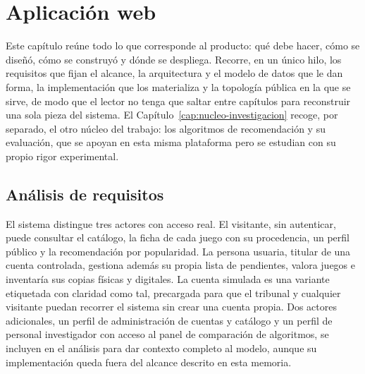 \chapter{Aplicación web}\label{cap:diseno}

Este capítulo reúne todo lo que corresponde al producto: qué debe hacer, cómo se diseñó, cómo
se construyó y dónde se despliega. Recorre, en un único hilo, los requisitos que fijan el
alcance, la arquitectura y el modelo de datos que le dan forma, la implementación que los
materializa y la topología pública en la que se sirve, de modo que el lector no tenga que
saltar entre capítulos para reconstruir una sola pieza del sistema. El Capítulo~\ref{cap:nucleo-investigacion}
recoge, por separado, el otro núcleo del trabajo: los algoritmos de recomendación y su
evaluación, que se apoyan en esta misma plataforma pero se estudian con su propio rigor
experimental.

\section{Análisis de requisitos}\label{cap:requisitos}

El sistema distingue tres actores con acceso real. El visitante, sin autenticar, puede
consultar el catálogo, la ficha de cada juego con su procedencia, un perfil público y la
recomendación por popularidad. La persona usuaria, titular de una cuenta controlada, gestiona
además su propia lista de pendientes, valora juegos e inventaría sus copias físicas y
digitales. La cuenta simulada es una variante etiquetada con claridad como tal, precargada
para que el tribunal y cualquier visitante puedan recorrer el sistema sin crear una cuenta
propia. Dos actores adicionales, un perfil de administración de cuentas y catálogo y un perfil
de personal investigador con acceso al panel de comparación de algoritmos, se incluyen en el
análisis para dar contexto completo al modelo, aunque su implementación queda fuera del
alcance descrito en esta memoria.

